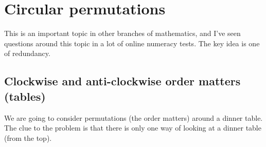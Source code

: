 \documentclass[12pt]{extbook}
\begin{document}
% 

% 






\section{Circular permutations}


This is an important topic in other branches of mathematics, and I've seen questions around this topic in a lot of online numeracy tests.  The key idea is one of redundancy.   

\subsection{Clockwise and anti-clockwise order matters (tables)}

We are going to consider permutations (the order matters) around a dinner table.   The clue to the problem is that there is only one way of looking at a dinner table (from the top).  
\end{document}
